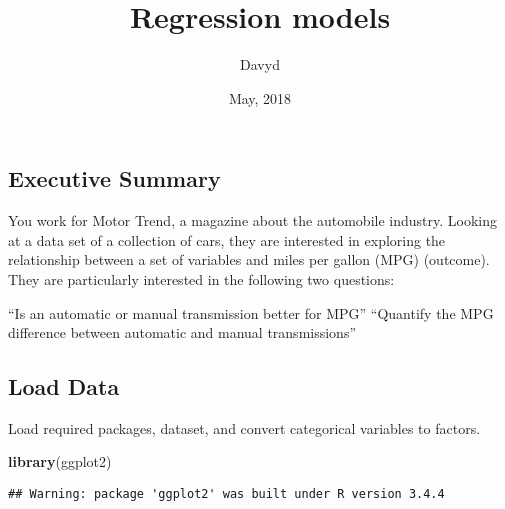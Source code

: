\documentclass[]{article}
\title{Regression models}
\author{Davyd}
\date{May, 2018}
\newenvironment{Shaded}{\begin{snugshade}}{\end{snugshade}}
\newcommand{\KeywordTok}[1]{\textcolor[rgb]{0.13,0.29,0.53}{\textbf{#1}}}
\newcommand{\DataTypeTok}[1]{\textcolor[rgb]{0.13,0.29,0.53}{#1}}
\newcommand{\DecValTok}[1]{\textcolor[rgb]{0.00,0.00,0.81}{#1}}
\newcommand{\StringTok}[1]{\textcolor[rgb]{0.31,0.60,0.02}{#1}}
\newcommand{\OperatorTok}[1]{\textcolor[rgb]{0.81,0.36,0.00}{\textbf{#1}}}
\newcommand{\NormalTok}[1]{#1}
\begin{document}
\maketitle

\subsection{Executive Summary}\label{executive-summary}

You work for Motor Trend, a magazine about the automobile industry.
Looking at a data set of a collection of cars, they are interested in
exploring the relationship between a set of variables and miles per
gallon (MPG) (outcome). They are particularly interested in the
following two questions:

``Is an automatic or manual transmission better for MPG'' ``Quantify the
MPG difference between automatic and manual transmissions''

\subsection{Load Data}\label{load-data}

Load required packages, dataset, and convert categorical variables to
factors.

\begin{Shaded}
\begin{Highlighting}[]
\KeywordTok{library}\NormalTok{(ggplot2)}
\end{Highlighting}
\end{Shaded}

\begin{verbatim}
## Warning: package 'ggplot2' was built under R version 3.4.4
\end{verbatim}

\begin{Shaded}
\end{Shaded}
\end{document}

